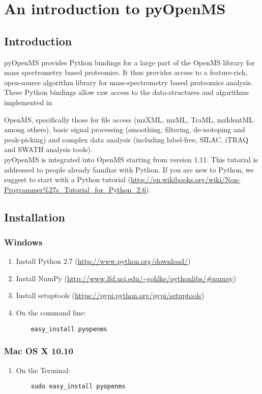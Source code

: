 
\newpage
\section{An introduction to pyOpenMS}

\subsection{Introduction}
pyOpenMS provides Python bindings for a large part of the OpenMS library for mass spectrometry based proteomics. It thus provides access to a feature-rich, open-source algorithm library for mass-spectrometry based proteomics analysis. These Python bindings allow raw access to the data-structures and algorithms implemented in {OpenMS, specifically those for file access (mzXML, mzML, TraML, mzIdentML among others), basic signal processing (smoothing, filtering, de-isotoping and peak-picking) and complex data analysis (including label-free, SILAC, iTRAQ and SWATH analysis tools).\\

pyOpenMS is integrated into OpenMS starting from version 1.11. This tutorial is addressed to people already familiar with Python. If you are new to Python, we suggest to start with a Python tutorial (\url{http://en.wikibooks.org/wiki/Non-Programmer%27s_Tutorial_for_Python_2.6}).

\subsection{Installation}
\subsubsection{Windows}
\begin{enumerate}
  \item Install Python 2.7 (\url{http://www.python.org/download/})
  \item Install NumPy (\url{http://www.lfd.uci.edu/~gohlke/pythonlibs/#numpy})
  \item Install setuptools (\url{https://pypi.python.org/pypi/setuptools})
  \item On the command line:
    \begin{lstlisting}
    easy_install pyopenms
    \end{lstlisting}
\end{enumerate}

\subsubsection{Mac OS X 10.10}
\begin{enumerate}
  \item On the Terminal:
    \begin{lstlisting}
    sudo easy_install pyopenms
    \end{lstlisting}
\end{enumerate}

}
